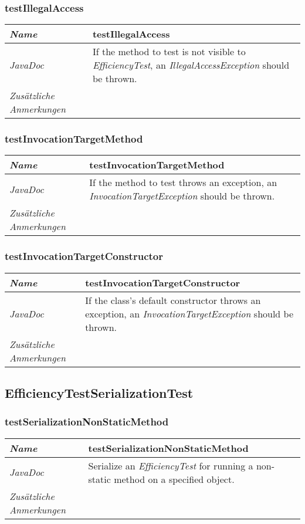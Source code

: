 \documentclass[a4paper]{report}
\begin{document}
\subsubsection{testIllegalAccess}
\begin{tabular}{p{2.3cm}  p{11.5cm}}
  \hline
 \textit{Name} & testIllegalAccess\\
  \hline
 \textit{JavaDoc} & If the method to test is not visible to \emph{EfficiencyTest}, an \emph{IllegalAccessException} should be thrown. \\
  \hline
 \textit{Zusätzliche Anmerkungen} & \\
  \hline
\end{tabular}

\subsubsection{testInvocationTargetMethod}
\begin{tabular}{p{2.3cm}  p{11.5cm}}
  \hline
 \textit{Name} & testInvocationTargetMethod\\
  \hline
 \textit{JavaDoc} & If the method to test throws an exception, an \emph{InvocationTargetException} should be thrown. \\
  \hline
 \textit{Zusätzliche Anmerkungen} & \\
  \hline
\end{tabular}

\subsubsection{testInvocationTargetConstructor}
\begin{tabular}{p{2.3cm}  p{11.5cm}}
  \hline
 \textit{Name} & testInvocationTargetConstructor\\
  \hline
 \textit{JavaDoc} & If the class's default constructor throws an exception, an \emph{InvocationTargetException} should be thrown. \\
  \hline
 \textit{Zusätzliche Anmerkungen} & \\
  \hline
\end{tabular}

\subsection{EfficiencyTestSerializationTest}

\subsubsection{testSerializationNonStaticMethod}
\begin{tabular}{p{2.3cm}  p{11.5cm}}
  \hline
 \textit{Name} & testSerializationNonStaticMethod\\
  \hline
 \textit{JavaDoc} & Serialize an \emph{EfficiencyTest} for running a non-static method on a specified object. \\
  \hline
 \textit{Zusätzliche Anmerkungen} & \\
  \hline
\end{tabular}
\end{document}
